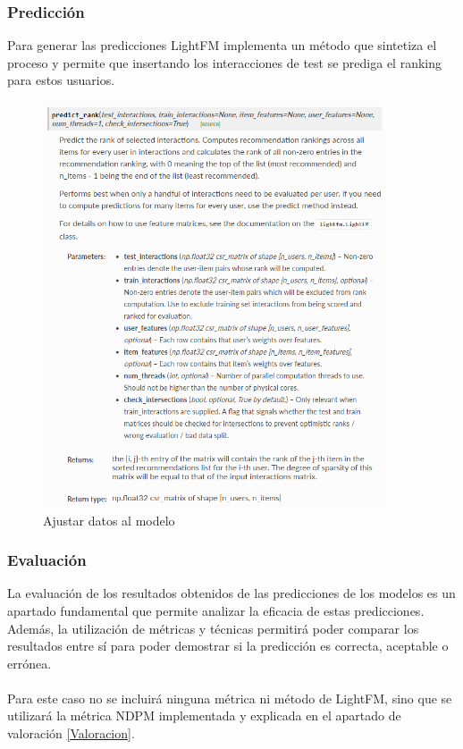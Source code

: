 \subsubsection{Predicción}
Para generar las predicciones LightFM implementa un método que sintetiza el proceso y permite que insertando los interacciones de test se prediga el ranking para estos usuarios.
\begin{figure}[H]
    \centering
    \includegraphics[width=0.9\textwidth]{Figuras/LightFM_predict_rank.png}    
    \caption{Ajustar datos al modelo} 
    \label{fig:FitPartial}
\end{figure}
\subsubsection{Evaluación}
La evaluación de los resultados obtenidos de las predicciones de los modelos es un apartado fundamental que permite analizar la eficacia de estas predicciones. Además, la utilización de métricas y técnicas permitirá poder comparar los resultados entre sí para poder demostrar si la predicción es correcta, aceptable o errónea.
\\ \\
Para este caso no se incluirá ninguna métrica ni método de LightFM, sino que se utilizará la métrica NDPM implementada y explicada en el apartado de valoración \ref{Valoracion}.


